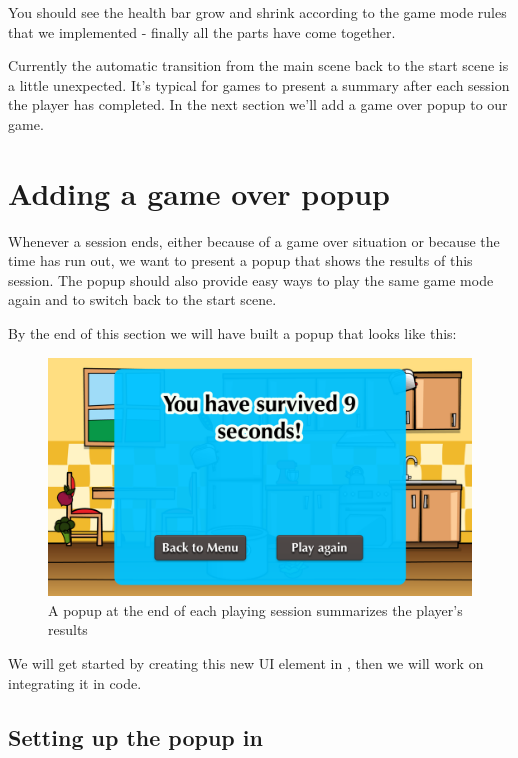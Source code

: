 You should see the health bar grow and shrink according to the game mode
rules that we implemented - finally all the parts have come together.

Currently the automatic transition from the main scene back to the start scene
is a little unexpected. It's typical for games to present a summary after each
session the player has completed. In the next section we'll add a game over
popup to our game.

\section{Adding a game over popup}
Whenever a session ends, either because of a game over situation or because the
time has run out, we want to present a popup that shows the results of this
session. The popup should also provide easy ways to play the same game mode
again and to switch back to the start scene.

By the end of this section we will have built a popup that looks like this:
\begin{figure}[H]
    \centering
    \includegraphics[width=0.5\linewidth]{images/Chapter7/game_over_popup.png}
    \caption{A popup at the end of each playing session summarizes the player's
    results}
\end{figure}

We will get started by creating this new UI element in \SB{}, then we will work
on integrating it in code.

\subsection{Setting up the popup in \SB{}}
